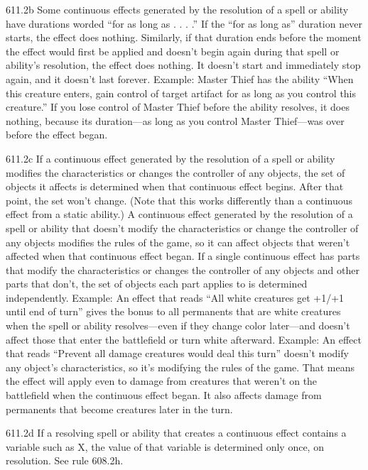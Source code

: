 611.2b Some continuous effects generated by the resolution of a spell or ability have durations worded “for as long as . . . .” If the “for as long as” duration never starts, the effect does nothing. Similarly, if that duration ends before the moment the effect would first be applied and doesn’t begin again during that spell or ability’s resolution, the effect does nothing. It doesn’t start and immediately stop again, and it doesn’t last forever.
Example: Master Thief has the ability “When this creature enters, gain control of target artifact for as long as you control this creature.” If you lose control of Master Thief before the ability resolves, it does nothing, because its duration—as long as you control Master Thief—was over before the effect began.

611.2c If a continuous effect generated by the resolution of a spell or ability modifies the characteristics or changes the controller of any objects, the set of objects it affects is determined when that continuous effect begins. After that point, the set won’t change. (Note that this works differently than a continuous effect from a static ability.) A continuous effect generated by the resolution of a spell or ability that doesn’t modify the characteristics or change the controller of any objects modifies the rules of the game, so it can affect objects that weren’t affected when that continuous effect began. If a single continuous effect has parts that modify the characteristics or changes the controller of any objects and other parts that don’t, the set of objects each part applies to is determined independently.
Example: An effect that reads “All white creatures get +1/+1 until end of turn” gives the bonus to all permanents that are white creatures when the spell or ability resolves—even if they change color later—and doesn’t affect those that enter the battlefield or turn white afterward.
Example: An effect that reads “Prevent all damage creatures would deal this turn” doesn’t modify any object’s characteristics, so it’s modifying the rules of the game. That means the effect will apply even to damage from creatures that weren’t on the battlefield when the continuous effect began. It also affects damage from permanents that become creatures later in the turn.

611.2d If a resolving spell or ability that creates a continuous effect contains a variable such as X, the value of that variable is determined only once, on resolution. See rule 608.2h.

